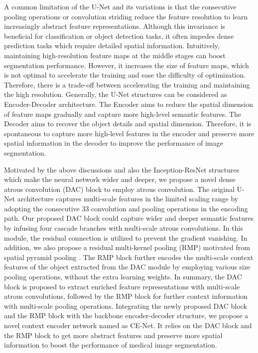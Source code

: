 \documentclass[journal]{IEEEtran}
\begin{document}
A common limitation of the U-Net and its variations is that the consecutive pooling operations or convolution striding reduce the feature resolution to learn increasingly abstract feature representations. Although this invariance is beneficial for classification or object detection tasks, it often impedes dense prediction tasks which require detailed spatial information. Intuitively, maintaining high-resolution feature maps at the middle stages can boost segmentation performance. However, it increases the size of feature maps, which is not optimal to accelerate the training and ease the difficulty of optimization. Therefore, there is a trade-off between accelerating the training and maintaining the high resolution. Generally, the U-Net structures can be considered as Encoder-Decoder architecture. The Encoder aims to reduce the spatial dimension of feature maps gradually and capture more high-level semantic features. The Decoder aims to recover the object details and spatial dimension. Therefore,
it is spontaneous to capture more high-level features in the encoder and preserve more spatial information in the decoder to improve the performance of image segmentation.


 Motivated by the above discussions and also the Inception-ResNet structures \cite{he2016deep, szegedy2017inception} which make the neural network wider and deeper, we propose a novel dense atrous convolution (DAC) block to employ atrous convolution. The original U-Net architecture captures multi-scale features in the limited scaling range by adopting the consecutive 33 convolution and pooling operations in the encoding path. Our proposed DAC block could capture wider and deeper semantic features by infusing four cascade branches with multi-scale atrous convolutions. In this module, the residual connection is utilized to prevent the gradient vanishing.
In addition, we also propose a residual multi-kernel pooling (RMP) motivated from spatial pyramid pooling \cite{he2014spatial}. The RMP block further encodes the multi-scale context features of the object extracted from the DAC module by employing various size pooling operations, without the extra learning weights.  In summary, the DAC block is proposed to extract enriched feature representations with multi-scale atrous convolutions, followed by the RMP block for further context information with multi-scale pooling operations. 
Integrating the newly proposed DAC block and the RMP block with the backbone encoder-decoder structure, we propose a novel context encoder network named as CE-Net. It relies on the DAC block and the RMP block to get more abstract features and preserve more spatial information to boost the performance of medical image segmentation. 
\end{document}
